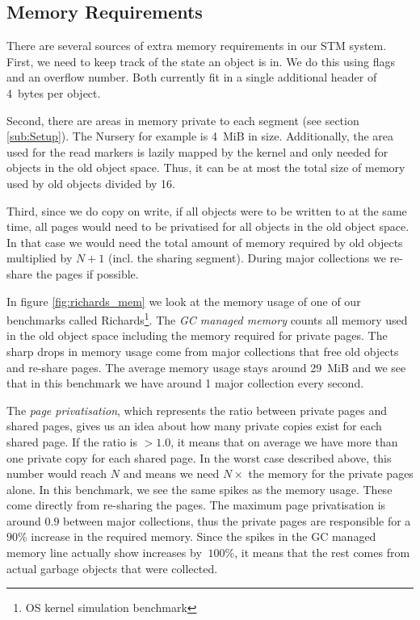 \documentclass{sigplanconf}
\begin{document}



\subsection{Memory Requirements}

There are several sources of extra memory requirements in our
STM system. First, we need to keep track of the state an object
is in. We do this using flags and an overflow number. Both currently
fit in a single additional header of 4~bytes per object.

Second, there are areas in memory private to each segment (see
section \ref{sub:Setup}). The Nursery for example is 4~MiB in
size. Additionally, the area used for the read markers is lazily
mapped by the kernel and only needed for objects in the old object
space. Thus, it can be at most the total size of memory used by
old objects divided by 16.

Third, since we do copy on write, if all objects were to be written to
at the same time, all pages would need to be privatised for all
objects in the old object space. In that case we would need the total
amount of memory required by old objects multiplied by $N+1$
(incl. the sharing segment). During major collections we re-share the
pages if possible.

In figure \ref{fig:richards_mem} we look at the memory usage of one of
our benchmarks called Richards\footnote{OS kernel simulation
benchmark}. The \emph{GC managed memory} counts all memory used in the
old object space including the memory required for private pages. The
sharp drops in memory usage come from major collections that free old
objects and re-share pages. The average memory usage stays around
29~MiB and we see that in this benchmark we have around 1 major
collection every second.

The \emph{page privatisation}, which represents the ratio between
private pages and shared pages, gives us an idea about how many
private copies exist for each shared page. If the ratio is $>1.0$, it
means that on average we have more than one private copy for each
shared page. In the worst case described above, this number would
reach $N$ and means we need $N\times$ the memory for the private
pages alone. In this benchmark, we see the same spikes as the memory
usage. These come directly from re-sharing the pages. The maximum page
privatisation is around $0.9$ between major collections, thus the
private pages are responsible for a $90\%$ increase in the required
memory. Since the spikes in the GC managed memory line actually
show increases by $~100\%$, it means that the rest comes from actual
garbage objects that were collected.
\end{document}
